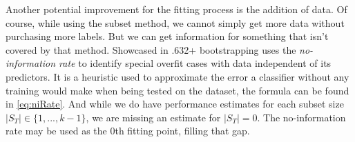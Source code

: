 Another potential improvement for the fitting process is the addition of data. Of course, while using the subset method, we cannot simply get more data without purchasing more labels. But we can get information for something that isn't covered by that method. Showcased in \cite{EfronEtAl1997} .632+ bootstrapping uses the \textit{no-information rate} to identify special overfit cases with data independent of its predictors. It is a heuristic used to approximate the error a classifier without any training would make when being tested on the dataset, the formula can be found in \eqref{eq:niRate}. And while we do have performance estimates for each subset size $|S_T| \in \{1, ..., k-1\}$, we are missing an estimate for $|S_T| = 0$. The no-information rate may be used as the 0th fitting point, filling that gap.